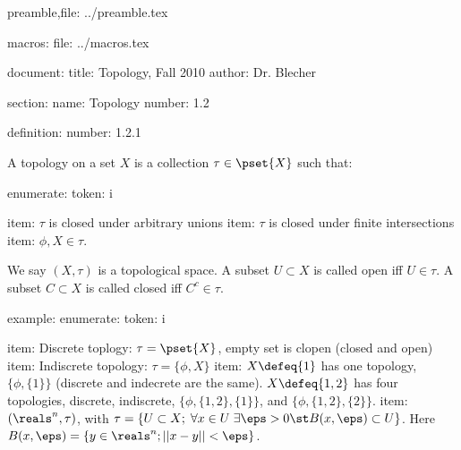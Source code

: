 
preamble,file:
    ../preamble.tex

macros:
    file:
        ../macros.tex
    
    \newcommand{\A}[0] { \mathcal{A} }
    \newcommand{\B}[0] { \mathcal{B} }
    \newcommand{\C}[0] { \mathcal{C} }
    \newcommand{\D}[0] { \mathcal{D} }
    \newcommand{\E}[0] { \mathcal{E} }
    \newcommand{\F}[0] { \mathcal{F} }
    \newcommand{\G}[0] { \mathcal{G} }
    \newcommand{\M}[0] { \mathcal{M} }
    \newcommand{\N}[0] { \mathcal{N} }
    \newcommand{\curlyO}[0] { \mathcal{O} }
    \newcommand{\R}[0] { \mathcal{R} }
    \newcommand{\curlyS}[0] { \mathcal{S} }
    \newcommand{\U}[0] { \mathcal{U} }
    \newcommand{\V}[0] { \mathcal{V} }
    \newcommand{\W}[0] { \mathcal{W} }
    \newcommand{\Bl}[0] { \mathcal{B} \ell }
    \newcommand{\Ell}[0] { \mathcal{L} }       


document:
    title:
        Topology, Fall 2010
    author:
        Dr. Blecher
    
    section:
        name:
            Topology
        number:
            1.2
    
    definition:
        number:
            1.2.1
        
        A topology on a set $X$ is a collection $\tau \in \pset{X}$ such that:
        
        enumerate:
            token:
                i
            
            item:
                $\tau$ is closed under arbitrary unions
            item:
                $\tau$ is closed under finite intersections
            item:
                $\phi, X \in \tau$.
        
        We say $(X, \tau)$ is a topological space. A subset $U \subset X$ is called open iff $U \in \tau$. A subset $C \subset X$ is called closed iff $C^c \in \tau$.
        
    example:
        enumerate:
            token:
                i
            
            item:
                Discrete toplogy: $\tau = \pset{X}$, empty set is clopen (closed and open)
            item:
                Indiscrete topology: $\tau = \{ \phi, X \}$
            item:
                $X \defeq \{ 1 \}$ has one topology, $\{ \phi, \{ 1\} \}$ (discrete and indecrete are the same). $X \defeq \{1, 2\}$ has four topologies, discrete, indiscrete, $\{ \phi , \{1,2\}, \{1\}\}$, and $\{ \phi, \{1,2\}, \{2\}\}$.
            item:
                $(\reals^n, \tau)$, with $\tau = \{ U \subset X; \; \forall x \in U \; \exists \eps>0 \st B(x,\eps) \subset U \}$. Here $B(x, \eps) = \{ y \in \reals^n; ||x-y|| < \eps \}$.

